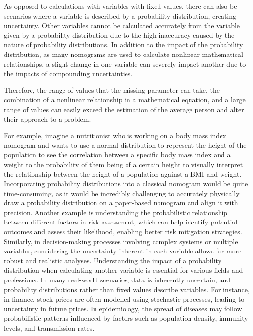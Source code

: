 \documentclass{l4proj}
\begin{document}
As opposed to calculations with variables with fixed values, there can also be scenarios where a variable is described by a probability distribution, creating uncertainty. Other variables cannot be calculated accurately from the variable given by a probability distribution due to the high inaccuracy caused by the nature of probability distributions. In addition to the impact of the probability distribution, as many nomograms are used to calculate nonlinear mathematical relationships, a slight change in one variable can severely impact another due to the impacts of compounding uncertainties.  

Therefore, the range of values that the missing parameter can take, the combination of a nonlinear relationship in a mathematical equation, and a large range of values can easily exceed the estimation of the average person and alter their approach to a problem.  

For example, imagine a nutritionist who is working on a body mass index nomogram and wants to use a normal distribution to represent the height of the population to see the correlation between a specific body mass index and a weight to the probability of them being of a certain height to visually interpret the relationship between the height of a population against a BMI and weight. Incorporating probability distributions into a classical nomogram would be quite time-consuming, as it would be incredibly challenging to accurately physically draw a probability distribution on a paper-based nomogram and align it with precision. Another example is understanding the probabilistic relationship between different factors in risk assessment, which can help identify potential outcomes and assess their likelihood, enabling better risk mitigation strategies. Similarly, in decision-making processes involving complex systems or multiple variables, considering the uncertainty inherent in each variable allows for more robust and realistic analyses.
Understanding the impact of a probability distribution when calculating another variable is essential for various fields and professions. In many real-world scenarios, data is inherently uncertain, and probability distributions rather than fixed values describe variables. For instance, in finance, stock prices are often modelled using stochastic processes, leading to uncertainty in future prices. In epidemiology, the spread of diseases may follow probabilistic patterns influenced by factors such as population density, immunity levels, and transmission rates.
\end{document}

